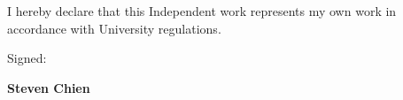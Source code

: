 \documentclass[letter, 11pt, oneside]{Thesis}  %
\begin{document}
\frontmatter      %

\title  {\titlename}
\addresses  {\groupname\\\deptname\\\univname}  %
\date       {\today}
\subject    {}
\keywords   {}

\maketitle


\fancyhead{}  %
\rhead{\thepage}  %
\lhead{}  %


\pagestyle{empty}

\vspace*{\fill}

I hereby declare that this Independent work represents my own work in accordance with University regulations.
 
\hfill 
 
Signed: \hrulefill

\textbf{Steven Chien}

\clearpage %

\end{document}
